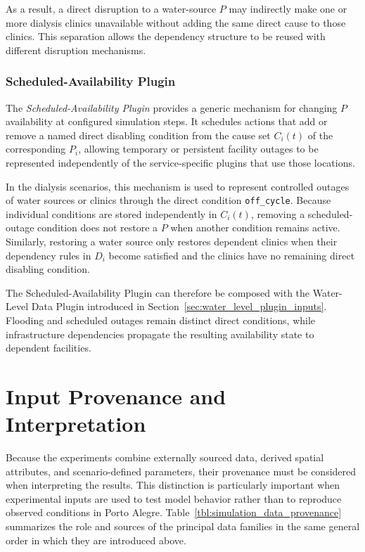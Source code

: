 As a result, a direct disruption to a water-source $P$ may indirectly make one or more dialysis clinics unavailable without adding the same direct cause to those clinics. This separation allows the dependency structure to be reused with different disruption mechanisms.

\subsubsection{Scheduled-Availability Plugin}
\label{sec:scheduled_availability_plugin_inputs}

The \textit{Scheduled-Availability Plugin} provides a generic mechanism for changing $P$ availability at configured simulation steps. It schedules actions that add or remove a named direct disabling condition from the cause set $C_i(t)$ of the corresponding $P_i$, allowing temporary or persistent facility outages to be represented independently of the service-specific plugins that use those locations.

In the dialysis scenarios, this mechanism is used to represent controlled outages of water sources or clinics through the direct condition \texttt{off\_cycle}. Because individual conditions are stored independently in $C_i(t)$, removing a scheduled-outage condition does not restore a $P$ when another condition remains active. Similarly, restoring a water source only restores dependent clinics when their dependency rules in $D_i$ become satisfied and the clinics have no remaining direct disabling condition.

The Scheduled-Availability Plugin can therefore be composed with the Water-Level Data Plugin introduced in Section~\ref{sec:water_level_plugin_inputs}. Flooding and scheduled outages remain distinct direct conditions, while infrastructure dependencies propagate the resulting availability state to dependent facilities. %




\section{Input Provenance and Interpretation}
\label{sec:input_provenance_summary}

Because the experiments combine externally sourced data, derived spatial attributes, and scenario-defined parameters, their provenance must be considered when interpreting the results. This distinction is particularly important when experimental inputs are used to test model behavior rather than to reproduce observed conditions in Porto Alegre.
Table~\ref{tbl:simulation_data_provenance} summarizes the role and sources of the principal data families in the same general order in which they are introduced above.

